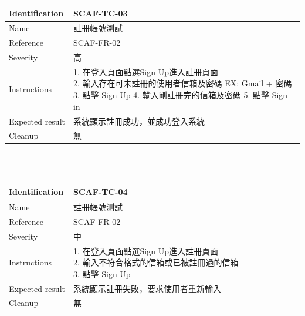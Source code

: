\documentclass{report}
\begin{document}
\begin{tabularx}{\textwidth}{
  |p{}%
  |p{}|%
  }
  \hline
  \centering Identification &  SCAF-TC-03 \\
  \hline
  \centering Name & 註冊帳號測試 \\
  \hline
  \centering Reference & SCAF-FR-02 \\
  \hline
  \centering Severity & 高 \\
  \hline
  \centering Instructions & 
  \makecell[l]{
    1. 在登入頁面點選Sign Up進入註冊頁面 \\
    2. 輸入存在可未註冊的使用者信箱及密碼 EX: Gmail + 密碼 \\
    3. 點擊 Sign Up
    4. 輸入剛註冊完的信箱及密碼
    5. 點擊 Sign in
  }\\
  \hline
  \centering Expected result & 系統顯示註冊成功，並成功登入系統 \\
  \hline
  \centering Cleanup & 無 \\
  \hline
\end{tabularx}
\\
\newline
\\
\begin{tabularx}{\textwidth}{
  |p{}%
  |p{}|%
  }
  \hline
  \centering Identification &  SCAF-TC-04 \\
  \hline
  \centering Name & 註冊帳號測試 \\
  \hline
  \centering Reference & SCAF-FR-02 \\
  \hline
  \centering Severity & 中 \\
  \hline
  \centering Instructions & 
  \makecell[l]{
    1. 在登入頁面點選Sign Up進入註冊頁面 \\
    2. 輸入不符合格式的信箱或已被註冊過的信箱  \\
    3. 點擊 Sign Up
  }\\
  \hline
  \centering Expected result & 系統顯示註冊失敗，要求使用者重新輸入 \\
  \hline
  \centering Cleanup & 無 \\
  \hline
\end{tabularx}
\\
\newline
\\
\end{document}
